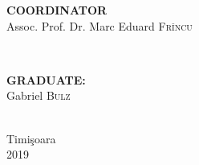 \documentclass[12pt, a4paper]{report}
\begin{document}
\begin{titlepage}

\begin{minipage}{0.4\textwidth}
\begin{flushleft} \large
\textbf{COORDINATOR}\\
Assoc. Prof. Dr. Marc Eduard \textsc{Fr\^incu} %
\end{flushleft}
\end{minipage}
~
\begin{minipage}{0.4\textwidth}
\begin{flushright} \large
\textbf{GRADUATE:} \\
Gabriel \textsc{Bulz} %
\end{flushright}
\end{minipage}\\[1cm]


\vfill
{\large Timi\c{s}oara \\2019}\\ %

 


\end{titlepage}


\end{document}
